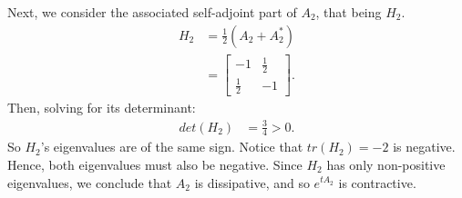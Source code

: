 \documentclass[12pt]{article}
\begin{document}
Next, we consider the associated self-adjoint part of $A_2$, that being $H_2$.
\begin{align*}
    H_2 & = \frac{1}{2}(A_2 + A_2^*)                \\
        & = \begin{bmatrix}
                -1 & \frac{1}{2} \\ \frac{1}{2} & -1
            \end{bmatrix}.
\end{align*}
Then, solving for its determinant:
\begin{align*}
    det(H_2) & = \frac{3}{4} > 0.
\end{align*}
So $H_2$'s eigenvalues are of the same sign.
Notice that $tr(H_2) = -2$ is negative.
Hence, both eigenvalues must also be negative.
Since $H_2$ has only non-positive eigenvalues, we conclude that $A_2$ is dissipative, and so $e^{tA_2}$ is contractive.
\end{document}
